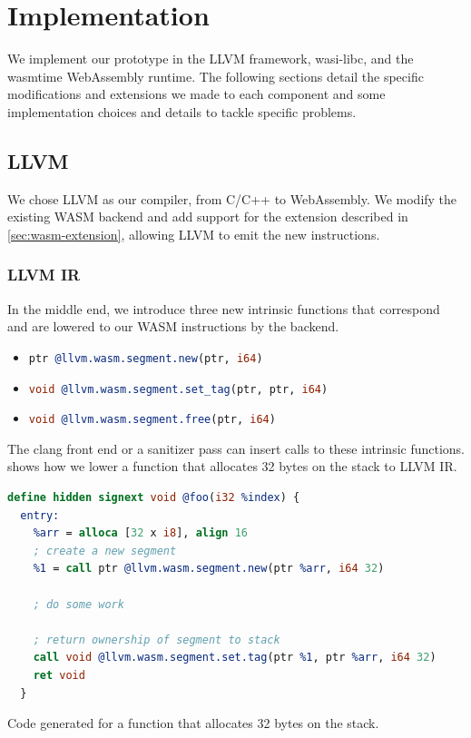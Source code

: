 \chapter{Implementation}
\label{ch:implementation}

We implement our prototype in the LLVM framework, wasi-libc, and the wasmtime WebAssembly runtime.
The following sections detail the specific modifications and extensions we made to each component and some implementation choices and details to tackle specific problems.


\section{LLVM}
\label{sec:llvm}

We chose LLVM as our compiler, from C/C++ to WebAssembly.
We modify the existing \ac{WASM} backend and add support for the extension described in \cref{sec:wasm-extension}, allowing LLVM to emit the new instructions.

\subsection{LLVM IR}
\label{subsec:llvm-ir}

In the middle end, we introduce three new intrinsic functions that correspond and are lowered to our \ac{WASM} instructions by the backend.

\begin{itemize}
    \item[] \lstinline[style=customc,language=llvm]{ptr @llvm.wasm.segment.new(ptr, i64)}
    \item[] \lstinline[style=customc,language=llvm]{void @llvm.wasm.segment.set_tag(ptr, ptr, i64)}
    \item[] \lstinline[style=customc,language=llvm]{void @llvm.wasm.segment.free(ptr, i64)}
\end{itemize}

\noindent
The clang front end or a sanitizer pass can insert calls to these intrinsic functions.
 shows how we lower a function that allocates 32 bytes on the stack to LLVM IR.

\begin{lstfloat}
    \begin{lstlisting}[frame=h,style=customc,
        label={lst:llvm-intrinsics},language=llvm]
  define hidden signext void @foo(i32 %index) {
  entry:
    %arr = alloca [32 x i8], align 16
    ; create a new segment
    %1 = call ptr @llvm.wasm.segment.new(ptr %arr, i64 32)

    ; do some work

    ; return ownership of segment to stack
    call void @llvm.wasm.segment.set.tag(ptr %1, ptr %arr, i64 32)
    ret void
  }
    \end{lstlisting}
    \caption{Code generated for a function that allocates 32 bytes on the stack.}
    \label{lst:llvm-intrinsics-float}
\end{lstfloat}

